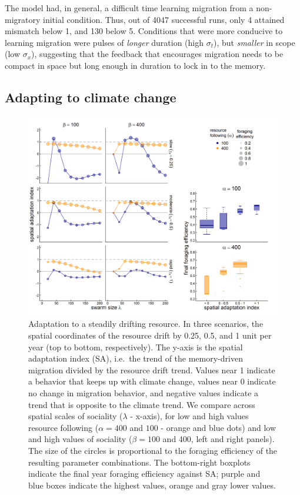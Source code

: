 \documentclass[utf8]{frontiersSCNS} %
\begin{document}
	The model had, in general, a difficult time learning migration from a non-migratory initial condition. Thus, out of 4047 successful runs, only 4 attained mismatch below 1, and 130 below 5. Conditions that were more conducive to learning migration were pulses of \emph{longer} duration (high $\sigma_t$), but \emph{smaller} in scope (low $\sigma_x$), suggesting that the feedback that encourages migration needs to be compact in space but long enough in duration to lock in to the memory.
	
	\subsection{Adapting to climate change}
	
	\begin{figure}
		\includegraphics[width = \textwidth]{figures/SpatialClimateChange.png}
		
		\caption{\label{fig_adaptationclimate} Adaptation to a steadily drifting resource. In three scenarios, the spatial coordinates of the resource drift by 0.25, 0.5, and 1 unit per year (top to bottom, respectively). The y-axis is the spatial adaptation index (SA), i.e.~the trend of the memory-driven migration divided by the resource drift trend. Values near 1 indicate a behavior that keeps up with climate change, values near 0 indicate no change in migration behavior, and negative values indicate a trend that is opposite to the climate trend. We compare across spatial scales of sociality ($\lambda$ - x-axis), for low and high values resource following ($\alpha = 400$ and $100$ - orange and blue dots) and low and high values of sociality ($\beta = 100$ and 400, left and right panels). The size of the circles is proportional to the foraging efficiency of the resulting parameter combinations. The bottom-right boxplots indicate the final year foraging efficiency against SA; purple and blue boxes indicate the highest values, orange and gray lower values.}
	\end{figure}
	
\end{document}
